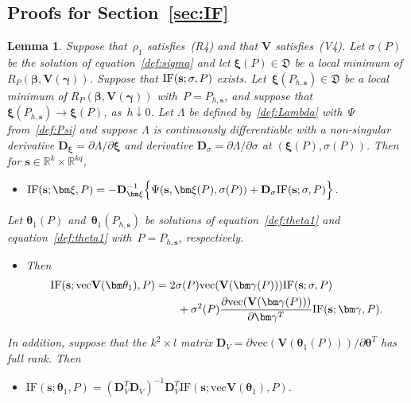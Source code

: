 \documentclass{article}
\numberwithin{equation}{section}
\theoremstyle{plain}
\newtheorem{lemma}{Lemma}
\newcommand{\R}{\mathbb{R}}
\newcommand{\vc}{\mathrm{vec}}
\newcommand{\bbeta}{\bm\beta}
\newcommand{\btheta}{\bm\theta}
\newcommand{\bxi}{\bm\xi}
\newcommand{\bgamma}{\bm\gamma}
\newcommand{\bs}{\mathbf{s}}
\newcommand{\bV}{\mathbf{V}}
\newcommand{\bD}{\mathbf{D}}
\begin{document}
\subsection{Proofs for Section~\ref{sec:IF}}
\begin{lemma}
\label{lem:IF xi sigma}
Suppose that~$\rho_1$ satisfies~(R4) and that $\bV$ satisfies~(V4).
Let $\sigma(P)$ be the solution of equation~\eqref{def:sigma} and 
let $\bxi(P)\in \mathfrak{D}$ be a local minimum of $R_P(\bbeta,\bV(\bgamma))$. 
Suppose that $\text{\rm IF}(\bs;\sigma,P)$ exists.
Let~$\bxi(P_{h,\bs})\in \mathfrak{D}$ 
be a local minimum of $R_P(\bbeta,\bV(\bgamma))$ with~$P=P_{h,\bs}$,
and suppose that $\bxi(P_{h,\bs})\to\bxi(P)$, as~$h\downarrow0$.
Let $\Lambda$ be defined by~\eqref{def:Lambda} with~$\Psi$ from~\eqref{def:Psi}
and suppose $\Lambda$ is continuously differentiable with a non-singular derivative 
$\bD_{\bxi}=\partial\Lambda/\partial\bxi$ 
and derivative $\bD_{\sigma}=\partial\Lambda/\partial\sigma$ at $(\bxi(P),\sigma(P))$.
Then for $\bs\in\R^k\times\R^{kq}$,
\begin{itemize}
\item[(i)]
$\text{\rm IF}(\bs;\bxi,P)
=
-\bD_{\bxi}^{-1}
\Big\{
\Psi(\bs,\bxi(P),\sigma(P))
+
\bD_\sigma
\text{\rm IF}(\bs;\sigma,P)
\Big\}$.
\end{itemize}
Let $\btheta_1(P)$ and~$\btheta_1(P_{h,\bs})$ be solutions of equation~\eqref{def:theta1}
and equation~\eqref{def:theta1} with~$P=P_{h,\bs}$, respectively.
\begin{itemize}
\item[(ii)]
Then 
\[
\begin{split}
\mathrm{IF}(\bs;\vc\bV(\btheta_1),P)
&=
2\sigma(P)
\vc(\bV(\bgamma(P)))
\mathrm{IF}(\bs;\sigma,P)\\
&\qquad+
\sigma^2(P)
\frac{\partial\vc(\bV(\bgamma(P)))}{\partial\bgamma^T}
\text{\rm IF}(\bs;\bgamma,P).
\end{split}
\]
\end{itemize}
In addition, suppose that the $k^2\times l$ matrix $\bD_V=\partial\vc(\bV(\btheta_1(P)))/\partial\btheta^T$ has full rank.
Then 
\begin{itemize}
\item[(iii)]
$\mathrm{IF}(\bs;\btheta_1,P)
=
(\bD_V^T\bD_V)^{-1}
\bD_V^T
\mathrm{IF}(\bs;\vc\bV(\btheta_1),P)$.
\end{itemize}
\end{lemma}
\end{document}
